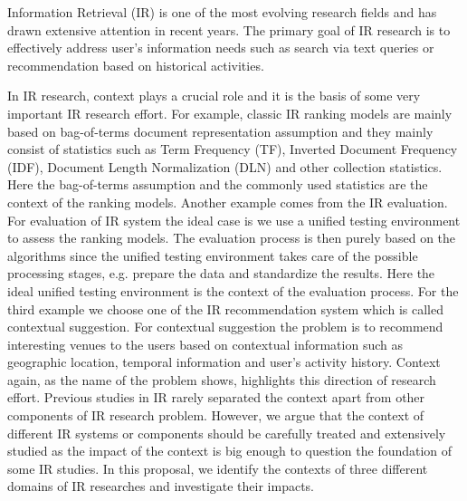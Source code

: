 %
%
Information Retrieval (IR) is one of the most evolving research fields 
and has drawn extensive attention in recent years. 
The primary goal of IR research is to effectively address user's 
information needs such as search via text queries or recommendation 
based on historical activities. 

In IR research, context plays a crucial role and it is the basis of some very 
important IR research effort.
For example, classic IR ranking models are mainly based on 
bag-of-terms document representation assumption and they mainly 
consist of statistics such as Term Frequency (TF), 
Inverted Document Frequency (IDF), 
Document Length Normalization (DLN) and other collection statistics. 
Here the bag-of-terms assumption 
and the commonly used statistics are the context of the ranking models. 
Another example comes from the IR evaluation. 
For evaluation of IR system the ideal case is we use a unified testing 
environment to assess the ranking models. 
The evaluation process is then purely based on the algorithms since the 
unified testing environment takes care of the possible processing stages, 
e.g. prepare the data and standardize the results. 
Here the ideal unified testing environment is the context of the evaluation 
process. 
For the third example we choose one of the IR recommendation system which is 
called contextual suggestion. For contextual suggestion the problem is to 
recommend interesting venues to the users based on contextual information 
such as geographic location, temporal information and user's activity history. 
Context again, as the name of the problem shows, highlights this direction 
of research effort. 
Previous studies in IR rarely separated the context apart from other 
components of IR research problem. However, we argue that the context of 
different IR systems or components should be carefully treated and extensively 
studied as the impact of the context is big enough to question the foundation 
of some IR studies.
In this proposal, we identify the contexts of three different domains 
of IR researches and investigate their impacts. 

